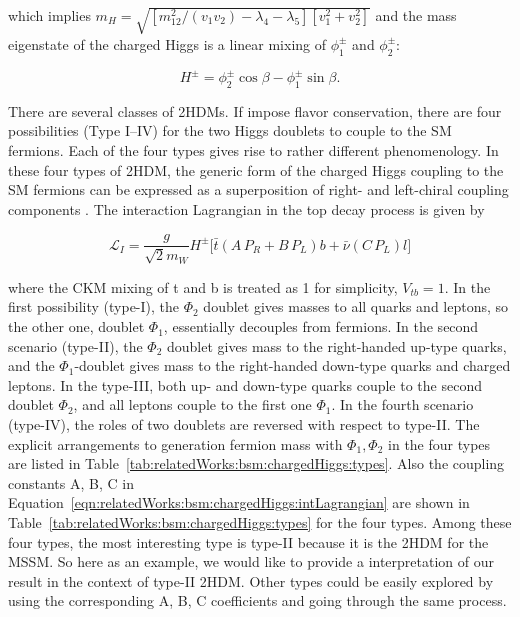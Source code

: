 \noindent which implies $m_{H} = \sqrt{ [m_{12}^2 /(v_1 v_2) - \lambda_4 - \lambda_5] [v_1^2+v_2^2]} $ and the mass eigenstate of the charged Higgs is a linear mixing of $\phi^\pm_1$ and $\phi^\pm_2$:

\begin{equation}
H^\pm = \phi_2^\pm \cos \beta - \phi_1^\pm \sin \beta .
\end{equation}


There are several classes of 2HDMs. If impose flavor conservation, there are four possibilities (Type I–IV) for the two Higgs doublets to couple to the SM fermions. Each of the four types gives rise to rather different phenomenology. In these four types of 2HDM, the generic form of the charged Higgs coupling to the SM fermions can be expressed as a superposition of right- and left-chiral coupling components \cite{PhysRevD.41.3421}. The interaction Lagrangian in the top decay process is given by

\begin{equation}
	\mathcal{L}_{I} =  \frac{g}{\sqrt{2} m_W} H^\pm \bigg[  \bar{t} (A \, P_R + B \, P_L) b + \bar{\nu}  (C\, P_L)  l \bigg]
    \label{eqn:relatedWorks:bsm:chargedHiggs:intLagrangian}
\end{equation}

\noindent where the CKM mixing of t and b is treated as 1 for simplicity, $V_{tb}=1$. In the first possibility (type-I), the $\Phi_2$ doublet gives masses to all quarks and leptons, so the other one, doublet $\Phi_1$, essentially decouples from fermions. In the second scenario (type-II), the $\Phi_2$ doublet gives mass to the right-handed up-type quarks, and the $\Phi_1$-doublet gives mass to the right-handed down-type quarks and charged leptons. In the type-III, both up- and down-type quarks couple to the second doublet $\Phi_2$, and all leptons couple to the first one $\Phi_1$. In the fourth scenario (type-IV), the roles of two doublets are reversed with respect to type-II. The explicit arrangements to generation fermion mass with $\Phi_1,\Phi_2$ in the four types are listed in Table~\ref{tab:relatedWorks:bsm:chargedHiggs:types}. Also the coupling constants A, B, C in Equation~\ref{eqn:relatedWorks:bsm:chargedHiggs:intLagrangian} are shown in  Table~\ref{tab:relatedWorks:bsm:chargedHiggs:types} for the four types. Among these four types, the most interesting type is type-II because it is the 2HDM for the MSSM. So here as an example, we would like to provide a interpretation of our result in the context of type-II 2HDM. Other types could be easily explored by using the corresponding A, B, C coefficients and going through the same process.

